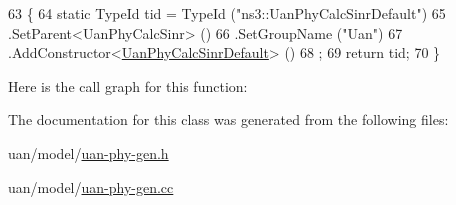 \begin{DoxyCode}
63 \{
64   \textcolor{keyword}{static} TypeId tid = TypeId (\textcolor{stringliteral}{"ns3::UanPhyCalcSinrDefault"})
65     .SetParent<UanPhyCalcSinr> ()
66     .SetGroupName (\textcolor{stringliteral}{"Uan"})
67     .AddConstructor<\hyperlink{classns3_1_1UanPhyCalcSinrDefault_a32154a52d903811b8f44a45e305344ab}{UanPhyCalcSinrDefault}> ()
68   ;
69   \textcolor{keywordflow}{return} tid;
70 \}
\end{DoxyCode}


Here is the call graph for this function\+:




The documentation for this class was generated from the following files\+:\begin{DoxyCompactItemize}
\item 
uan/model/\hyperlink{uan-phy-gen_8h}{uan-\/phy-\/gen.\+h}\item 
uan/model/\hyperlink{uan-phy-gen_8cc}{uan-\/phy-\/gen.\+cc}\end{DoxyCompactItemize}
